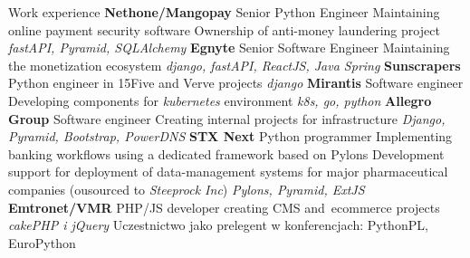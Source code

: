 \begin{rubric}{Work experience}
\textbf{Nethone/Mangopay}\newline
    Senior Python Engineer\newline
    Maintaining online payment security software\newline
    Ownership of anti-money laundering project\newline
    \textit{fastAPI, Pyramid, SQLAlchemy}
\textbf{Egnyte}\newline
    Senior Software Engineer\newline
    Maintaining the monetization ecosystem\newline
    \textit{django, fastAPI, ReactJS, Java Spring}
\textbf{Sunscrapers}\newline
    Python engineer in 15Five and Verve projects\newline
    \textit{django}
\textbf{Mirantis}\newline
    Software engineer\newline
    Developing components for \textit{kubernetes} environment\newline
    \textit{k8s, go, python}
\textbf{Allegro Group}\newline
    Software engineer\newline
    Creating internal projects for infrastructure\newline
    \textit{Django, Pyramid, Bootstrap, PowerDNS}
\textbf{STX Next}\newline
    Python programmer\newline
    Implementing banking workflows using a dedicated framework based on Pylons
    Development support for deployment of data-management systems for major
    pharmaceutical companies (ousourced to \textit{Steeprock Inc})
    \textit{Pylons, Pyramid, ExtJS}\newline
{}\textbf{Emtronet/VMR}
    PHP/JS developer\newline
    creating CMS and~\hbox{ecommerce} projects\newline
    \textit{cakePHP i jQuery}
\entry*[inne]Uczestnictwo jako prelegent w konferencjach:\newline
    PythonPL, EuroPython
\end{rubric}
